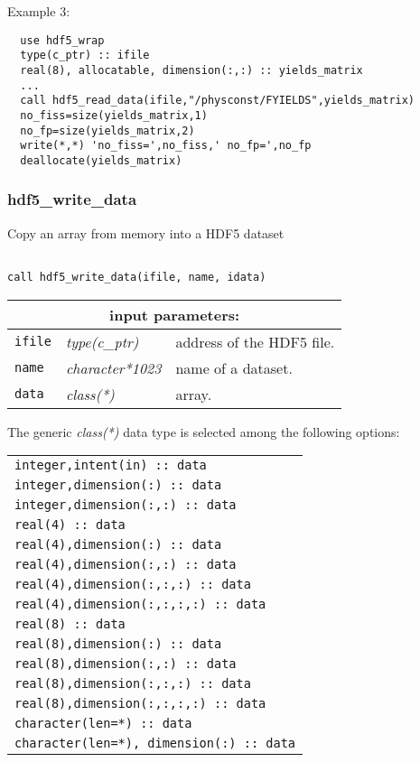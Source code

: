 \noindent Example 3:
\begin{verbatim}
  use hdf5_wrap
  type(c_ptr) :: ifile
  real(8), allocatable, dimension(:,:) :: yields_matrix
  ...
  call hdf5_read_data(ifile,"/physconst/FYIELDS",yields_matrix)
  no_fiss=size(yields_matrix,1)
  no_fp=size(yields_matrix,2)
  write(*,*) 'no_fiss=',no_fiss,' no_fp=',no_fp
  deallocate(yields_matrix)
\end{verbatim}

\subsubsection{hdf5\_write\_data}

Copy an array from memory into a HDF5 dataset

\begin{verbatim}

call hdf5_write_data(ifile, name, idata)
\end{verbatim}

\noindent
\begin{tabular}{|p{1.5cm}|p{3cm}|p{10cm}|}
\hline
\multicolumn{3}{|c|}{\bf input parameters:} \\
\hline
{\tt ifile} & {\it type(c\_ptr)} & address of the HDF5 file. \\
\hline
{\tt name} & {\it character*1023} & name of a dataset. \\
\hline
{\tt data} & {\it class(*)} & array.\\
\hline
\end{tabular}

\vskip 0.5cm
\goodbreak

\noindent The generic {\it class(*)} data type is selected among the following options:

\vskip 0.2cm
\begin{tabular}{|p{8.5cm}|}
\hline
{\tt integer,intent(in) :: data} \\
{\tt integer,dimension(:) :: data} \\
{\tt integer,dimension(:,:) :: data} \\
{\tt real(4) :: data} \\
{\tt real(4),dimension(:) :: data} \\
{\tt real(4),dimension(:,:) :: data} \\
{\tt real(4),dimension(:,:,:) :: data} \\
{\tt real(4),dimension(:,:,:,:) :: data} \\
{\tt real(8) :: data} \\
{\tt real(8),dimension(:) :: data} \\
{\tt real(8),dimension(:,:) :: data} \\
{\tt real(8),dimension(:,:,:) :: data} \\
{\tt real(8),dimension(:,:,:,:) :: data} \\
{\tt character(len=*) :: data} \\
{\tt character(len=*), dimension(:) :: data} \\
\hline
\end{tabular}

